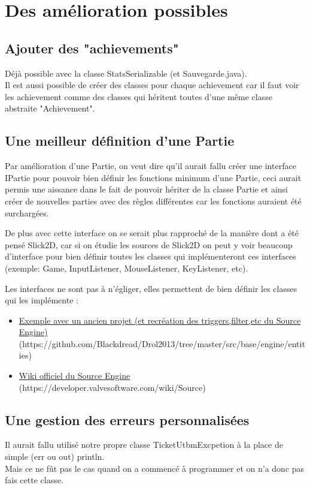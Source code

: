 \documentclass{report}
\begin{document}
\section{Des amélioration possibles}
\subsection{Ajouter des "achievements"}
Déjà possible avec la classe StatsSerializable (et Sauvegarde.java).\\
Il est aussi possible de créer des classes pour chaque achievement car il faut voir les achievement comme des classes qui héritent toutes d'une même classe abstraite "Achievement".
\subsection{Une meilleur définition d'une Partie}
Par amélioration d'une Partie, on veut dire qu'il aurait fallu créer une interface IPartie pour pouvoir bien définir les fonctions minimum d'une Partie, ceci aurait permis une aissance dans le fait de pouvoir hériter de la classe Partie et ainsi créer de nouvelles parties avec des règles différentes car les fonctions auraient été surchargées.


De plus avec cette interface on se serait plus rapproché de la manière dont a été pensé Slick2D, car si on étudie les sources de Slick2D on peut y voir beaucoup d'interface pour bien définir toutes les classes qui implémenteront ces interfaces (exemple: Game, InputListener, MouseListener, KeyListener, etc).


Les interfaces ne sont pas à n'égliger, elles permettent de bien définir les classes qui les implémente :
\begin{itemize}
\item \href{https://github.com/Blackdread/Drol2013/tree/master/src/base/engine/entities}{Exemple avec un ancien projet (et recréation des triggers,filter,etc du Source Engine)}  (https://github.com/Blackdread/Drol2013/tree/master/src/base/engine/entities)
\item \href{https://developer.valvesoftware.com/wiki/Source}{Wiki officiel du Source Engine}  (https://developer.valvesoftware.com/wiki/Source)
\end{itemize}
\subsection{Une gestion des erreurs personnalisées}
Il aurait fallu utilisé notre propre classe TicketUtbmExcpetion à la place de simple (err ou out) println.\\ Mais ce ne fût pas le cas quand on a commencé à programmer et on n'a donc pas fais cette classe.

\end{document}
